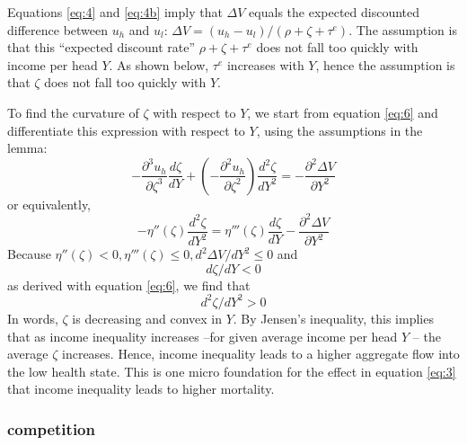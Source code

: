 \documentclass[a4paper,12pt]{article}
\begin{document}
Equations \eqref{eq:4} and \eqref{eq:4b} imply that \(\Delta V\) equals the expected discounted difference between \(u_h\) and \(u_l\): \(\Delta V = (u_h-u_l)/(\rho+\zeta+\tau^e)\). The assumption is that this ``expected discount rate'' \(\rho+\zeta+\tau^e\) does not fall too quickly with income per head \(Y\). As shown below, \(\tau^e\) increases with \(Y\), hence the assumption is that \(\zeta\) does not fall too quickly with \(Y\).

To find the curvature of \(\zeta\) with respect to \(Y\), we start from equation \eqref{eq:6} and differentiate this expression with respect to \(Y\), using the assumptions in the lemma:
\begin{equation}
\label{eq:33}
-\frac{\partial^3 u_h}{\partial \zeta^3} \frac{d\zeta}{dY} + \left(-\frac{\partial^2 u_h}{\partial \zeta^2} \right) \frac{d^2 \zeta}{dY^2} = - \frac{\partial^2 \Delta V}{\partial Y^2}
\end{equation}
or equivalently,
\begin{equation}
\label{eq:34}
- \eta''(\zeta) \frac{d^2 \zeta}{dY^2} = \eta'''(\zeta) \frac{d\zeta}{dY} - \frac{\partial^2 \Delta V}{\partial Y^2}
\end{equation}
Because \(\eta''(\zeta) <0, \eta'''(\zeta) \leq 0, d^2 \Delta V/dY^2 \leq 0\) and
\begin{equation}
\label{eq:40}
    d\zeta/dY < 0
\end{equation}
as derived with equation \eqref{eq:6}, we find that
\begin{equation}
\label{eq:30}
d^2 \zeta/dY^2 >0
\end{equation}
In words, \(\zeta\) is decreasing and convex in \(Y\). By Jensen's inequality, this implies that as income inequality increases --for given average income per head \(Y\) -- the average \(\zeta\) increases. Hence, income inequality leads to a higher aggregate flow into the low health state. This is one micro foundation for the effect in equation \eqref{eq:3} that income inequality leads to higher mortality.


\subsubsection{competition}
\label{sec:org57edb98}
\end{document}
